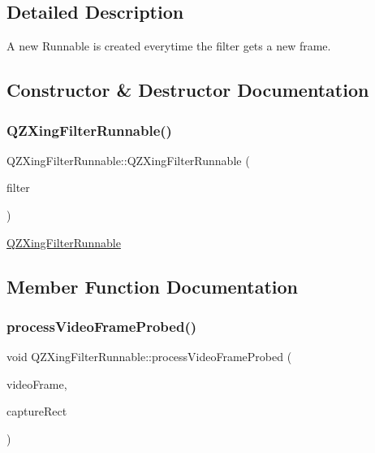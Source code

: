 \subsection{Detailed Description}
A new Runnable is created everytime the filter gets a new frame. 

\subsection{Constructor \& Destructor Documentation}
\mbox{\label{class_q_z_xing_filter_runnable_ae8ed468a251cc2daa6b251346c6c33e5}} 
\subsubsection{\texorpdfstring{Q\+Z\+Xing\+Filter\+Runnable()}{QZXingFilterRunnable()}}
{\footnotesize\ttfamily Q\+Z\+Xing\+Filter\+Runnable\+::\+Q\+Z\+Xing\+Filter\+Runnable (\begin{DoxyParamCaption}\item[{\mbox{\hyperlink{class_q_z_xing_filter}{Q\+Z\+Xing\+Filter}} $\ast$}]{filter }\end{DoxyParamCaption})\hspace{0.3cm}{\ttfamily [explicit]}}

\mbox{\hyperlink{class_q_z_xing_filter_runnable}{Q\+Z\+Xing\+Filter\+Runnable}} 

\subsection{Member Function Documentation}
\mbox{\label{class_q_z_xing_filter_runnable_a319ed1ef7b808ee6098e013c4f3387eb}} 
\subsubsection{\texorpdfstring{process\+Video\+Frame\+Probed()}{processVideoFrameProbed()}}
{\footnotesize\ttfamily void Q\+Z\+Xing\+Filter\+Runnable\+::process\+Video\+Frame\+Probed (\begin{DoxyParamCaption}\item[{\mbox{\hyperlink{struct_simple_video_frame}{Simple\+Video\+Frame}} \&}]{video\+Frame,  }\item[{const Q\+Rect \&}]{capture\+Rect }\end{DoxyParamCaption})}


